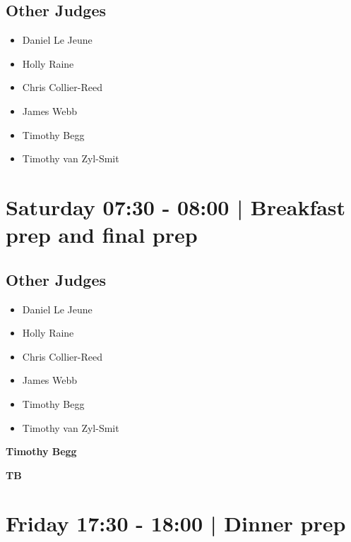 \documentclass[10pt, A5]{article}
\newcommand{\newtitle}[1]{\begin{center}{\Huge\bfseries #1 }\\ \vspace{5mm}\end{center}}
\newcommand{\newsubtitle}[1]{\begin{center}{\color{grey}\Large\bfseries #1 }\\ \vspace{5mm}\end{center}}
\begin{document}
                
        \subsection*{Other Judges}
        
            \begin{itemize}
                            \item Daniel Le Jeune
                            \item Holly Raine
                            \item Chris Collier-Reed
                            \item James Webb
                            \item Timothy Begg
                            \item Timothy van Zyl-Smit
                        \end{itemize}
        

            \section*{Saturday 07:30
        -
        08:00
        |
         Breakfast prep and final prep}
        
                
        \subsection*{Other Judges}
        
            \begin{itemize}
                            \item Daniel Le Jeune
                            \item Holly Raine
                            \item Chris Collier-Reed
                            \item James Webb
                            \item Timothy Begg
                            \item Timothy van Zyl-Smit
                        \end{itemize}
        

    
	\clearpage

		\newtitle{Timothy Begg}
	\newsubtitle{TB}

            \section*{Friday 17:30
        -
        18:00
        |
         Dinner prep}
        
\end{document}
